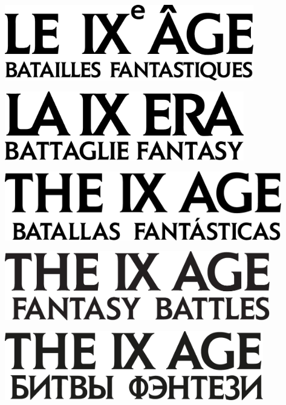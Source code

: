 \begin{titlepage}
\begin{center}
\ifdef{\booktitle}{}{\newcommand{\booktitle}{Missing book title}}


\ifdefined\languageisfrench

\includegraphics[height=3.3cm]{../Layout/pics/BRAND9AgeLogotype_FR.pdf}%

\else
\ifdefined\languageisitalian

\includegraphics[height=3cm]{../Layout/pics/BRAND9AgeLogotype_IT.pdf}%

\else

\ifdefined\languageisspanish

\includegraphics[height=3cm]{../Layout/pics/BRAND9AgeLogotype_ES.pdf}%

\else

\ifdefined\languageisgerman

\includegraphics[height=3cm]{../Layout/pics/BRAND9AgeLogotype.pdf}%

\else

\ifdefined\languageisrussian

\includegraphics[height=3cm]{../Layout/pics/BRAND9AgeLogotype_RU.pdf}%


\end{center}
\end{titlepage}

